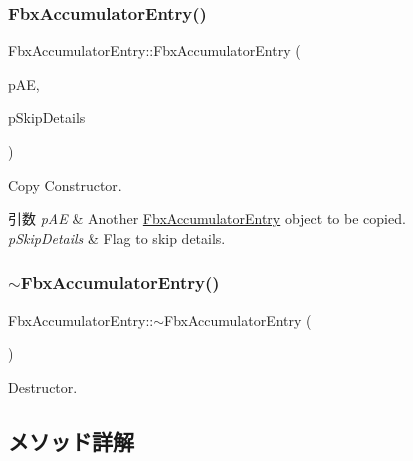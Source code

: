 \subsubsection{\texorpdfstring{Fbx\+Accumulator\+Entry()}{FbxAccumulatorEntry()}\hspace{0.1cm}{\footnotesize\ttfamily [2/2]}}
{\footnotesize\ttfamily Fbx\+Accumulator\+Entry\+::\+Fbx\+Accumulator\+Entry (\begin{DoxyParamCaption}\item[{const \hyperlink{class_fbx_accumulator_entry}{Fbx\+Accumulator\+Entry} \&}]{p\+AE,  }\item[{bool}]{p\+Skip\+Details }\end{DoxyParamCaption})}

Copy Constructor. 
\begin{DoxyParams}{引数}
{\em p\+AE} & Another \hyperlink{class_fbx_accumulator_entry}{Fbx\+Accumulator\+Entry} object to be copied. \\
\hline
{\em p\+Skip\+Details} & Flag to skip details. \\
\hline
\end{DoxyParams}
\mbox{\label{class_fbx_accumulator_entry_a76e1a283bd8e13c1591b83ed85cb5a10}} 
\subsubsection{\texorpdfstring{$\sim$\+Fbx\+Accumulator\+Entry()}{~FbxAccumulatorEntry()}}
{\footnotesize\ttfamily Fbx\+Accumulator\+Entry\+::$\sim$\+Fbx\+Accumulator\+Entry (\begin{DoxyParamCaption}{ }\end{DoxyParamCaption})}



Destructor. 



\subsection{メソッド詳解}
\mbox{\label{class_fbx_accumulator_entry_a2c6baa9720f96ecf7a9cc69f89b5c430}} 
